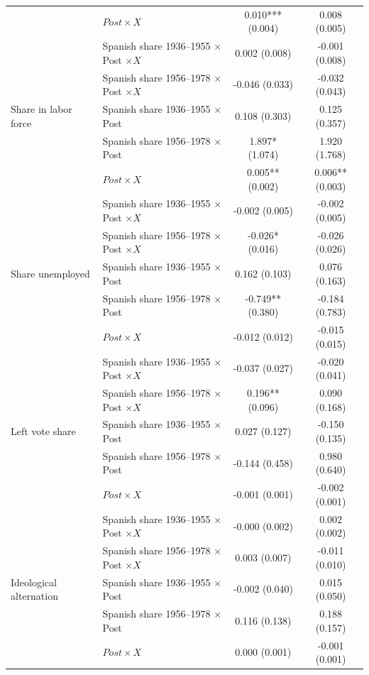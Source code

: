 \begin{table}[!htbp]
\begin{tabular}{llcc}
 & \(Post \times X\) & 0.010*** (0.004) & 0.008 (0.005) \\
 & Spanish share 1936--1955 \(\times\) Post \(\times X\) & 0.002 (0.008) & -0.001 (0.008) \\
 & Spanish share 1956--1978 \(\times\) Post \(\times X\) & -0.046 (0.033) & -0.032 (0.043) \\
\addlinespace
Share in labor force & Spanish share 1936--1955 \(\times\) Post & 0.108 (0.303) & 0.125 (0.357) \\
 & Spanish share 1956--1978 \(\times\) Post & 1.897* (1.074) & 1.920 (1.768) \\
 & \(Post \times X\) & 0.005** (0.002) & 0.006** (0.003) \\
 & Spanish share 1936--1955 \(\times\) Post \(\times X\) & -0.002 (0.005) & -0.002 (0.005) \\
 & Spanish share 1956--1978 \(\times\) Post \(\times X\) & -0.026* (0.016) & -0.026 (0.026) \\
\addlinespace
Share unemployed & Spanish share 1936--1955 \(\times\) Post & 0.162 (0.103) & 0.076 (0.163) \\
 & Spanish share 1956--1978 \(\times\) Post & -0.749** (0.380) & -0.184 (0.783) \\
 & \(Post \times X\) & -0.012 (0.012) & -0.015 (0.015) \\
 & Spanish share 1936--1955 \(\times\) Post \(\times X\) & -0.037 (0.027) & -0.020 (0.041) \\
 & Spanish share 1956--1978 \(\times\) Post \(\times X\) & 0.196** (0.096) & 0.090 (0.168) \\
\addlinespace
Left vote share & Spanish share 1936--1955 \(\times\) Post & 0.027 (0.127) & -0.150 (0.135) \\
 & Spanish share 1956--1978 \(\times\) Post & -0.144 (0.458) & 0.980 (0.640) \\
 & \(Post \times X\) & -0.001 (0.001) & -0.002 (0.001) \\
 & Spanish share 1936--1955 \(\times\) Post \(\times X\) & -0.000 (0.002) & 0.002 (0.002) \\
 & Spanish share 1956--1978 \(\times\) Post \(\times X\) & 0.003 (0.007) & -0.011 (0.010) \\
\addlinespace
Ideological alternation & Spanish share 1936--1955 \(\times\) Post & -0.002 (0.040) & 0.015 (0.050) \\
 & Spanish share 1956--1978 \(\times\) Post & 0.116 (0.138) & 0.188 (0.157) \\
 & \(Post \times X\) & 0.000 (0.001) & -0.001 (0.001) \\

\end{tabular}
\end{table}
